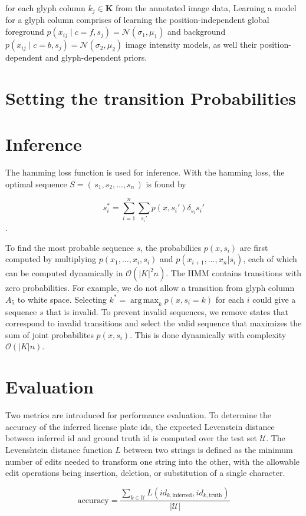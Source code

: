 \documentclass[a4paper,12pt]{article}
\DeclareMathOperator*{\argmax}{arg\,max}
\begin{document}
for each glyph column $k_j \in \mathbf{K}$ from the annotated image
data, Learning a model for a glyph column comprises of learning the
position-independent global foreground $ p(x_{ij}\mid
c=f,s_j)=\mathcal{N}(\sigma_1,\mu_1)$ and background $p(x_{ij} \mid
c=b,s_j)=\mathcal{N}(\sigma_2,\mu_2)$ image intensity models, as well
their position-dependent and glyph-dependent priors.

\section{Setting the transition Probabilities}

\section{Inference}
The hamming loss function is used for inference. With the hamming
loss, the optimal sequence $S = \left(\,s_1,s_2,\dots,s_n\,\right)$ is
found by

\[ s_i^* = \sum_{i=1}^{n}\sum_{s_i'}p(x,s_i')\delta_{s_i}{s_i'} \]. 

To find the most probable sequence $s$, the probabiliies $p(x,s_i)$
are first computed by multiplying $p(x_1,\ldots,x_i,s_i)$ and
$p(x_{i+1},\ldots,x_n|s_i)$, each of which can be computed dynamically
in $\mathcal{O}(|K|^2n)$. The HMM contains transitions with zero
probabilities. For example, we do not allow a transition from glyph
column $A_5$ to white space. Selecting $k^*=\argmax_k{p(x,s_i=k)}$ for
each $i$ could give a sequence $s$ that is invalid. To prevent invalid
sequences, we remove states that correspond to invalid transitions and
select the valid sequence that maximizes the sum of joint probabilites
$p(x,s_i)$. This is done dynamically with complexity
$\mathcal{O}(|K|n)$.

\section{Evaluation}
Two metrics are introduced for performance evaluation. To determine
the accuracy of the inferred license plate ids, the expected
Levenstein distance between inferred id and ground truth id is
computed over the test set $\mathcal{U}$. The Levenshtein distance
function $L$ between two strings is defined as the minimum number of
edits needed to transform one string into the other, with the
allowable edit operations being insertion, deletion, or substitution
of a single character.

\[ \text{accuracy} = \frac{\sum_{k \in \mathcal{U}}
  L(id_{k,\text{inferred}},id_{k,\text{truth}})}{|\mathcal{U}|} \]
\end{document}
